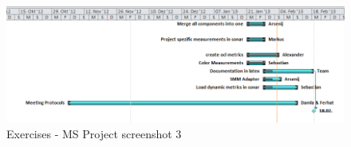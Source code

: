 \newpage

\begin{figure}[htb]
\begin{center}
\includegraphics[width=\textwidth]{msp_part3}
\caption{Exercises - MS Project screenshot 3}
\end{center}
\end{figure}